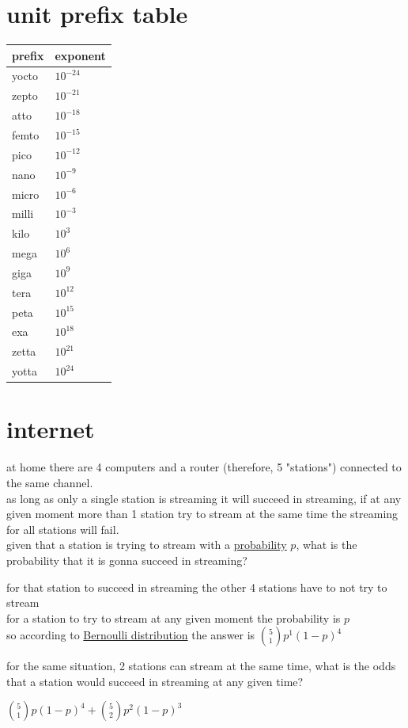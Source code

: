 \documentclass[a4paper,12pt]{article}
\begin{document}
\section{unit prefix table}
\label{sec:org48badb5}
\begin{center}
\begin{tabular}{ll}
prefix & exponent\\
\hline
yocto & \(10^{-24}\)\\
zepto & \(10^{-21}\)\\
atto & \(10^{-18}\)\\
femto & \(10^{-15}\)\\
pico & \(10^{-12}\)\\
nano & \(10^{-9}\)\\
micro & \(10^{-6}\)\\
milli & \(10^{-3}\)\\
kilo & \(10^3\)\\
mega & \(10^6\)\\
giga & \(10^9\)\\
tera & \(10^{12}\)\\
peta & \(10^{15}\)\\
exa & \(10^{18}\)\\
zetta & \(10^{21}\)\\
yotta & \(10^{24}\)\\
\end{tabular}
\end{center}
\section{internet}
\label{sec:orga773caf}
\begin{question}
at home there are 4 computers and a router (therefore, 5 "stations") connected to the same channel.\\
as long as only a single station is streaming it will succeed in streaming, if at any given moment more than 1 station try to stream at the same time the streaming for all stations will fail.\\
given that a station is trying to stream with a \href{20220813151352-probability.org}{probability} \(p\), what is the probability that it is gonna succeed in streaming?\\
\begin{answer}
for that station to succeed in streaming the other 4 stations have to not try to stream\\
for a station to try to stream at any given moment the probability is \(p\)\\
so according to \href{20220813151352-probability.org}{Bernoulli distribution} the answer is \(\binom{5}{1}p^1(1-p)^4\)\\
\end{answer}
\begin{subquestion}
for the same situation, 2 stations can stream at the same time, what is the odds that a station would succeed in streaming at any given time?\\
\begin{answer}
\(\binom{5}{1}p(1-p)^4 + \binom{5}{2}p^2(1-p)^3\)\\
\end{answer}
\end{subquestion}
\end{question}
\end{document}
